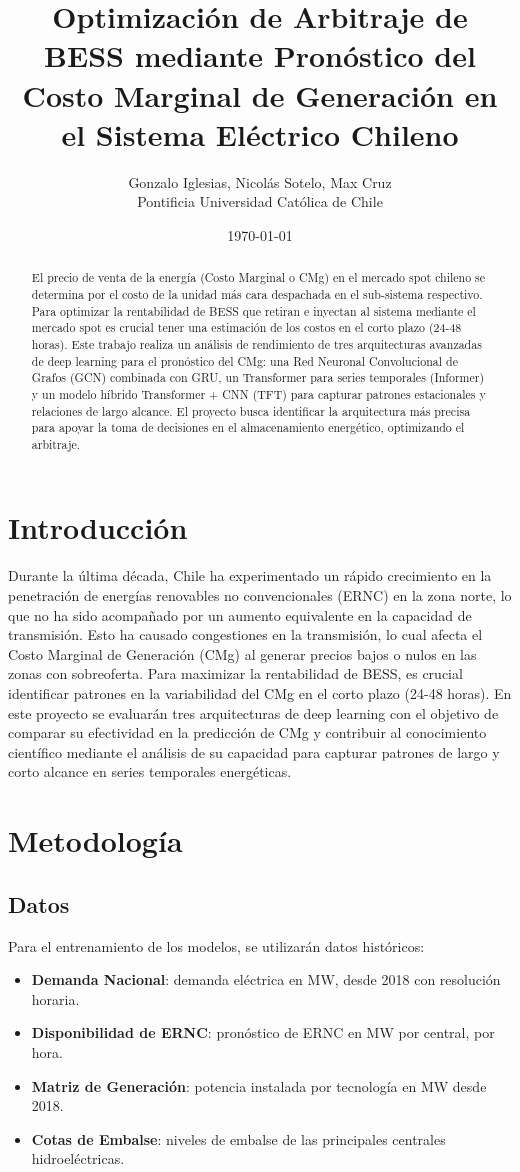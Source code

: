 \documentclass[twocolumn]{article}
\title{Optimización de Arbitraje de BESS mediante Pronóstico del Costo Marginal de Generación en el Sistema Eléctrico Chileno}
\author{Gonzalo Iglesias, Nicolás Sotelo, Max Cruz  \\
    Pontificia Universidad Católica de Chile  \\
    }
\date{\today}
\begin{document}
\maketitle

\begin{abstract}
El precio de venta de la energía (Costo Marginal o CMg) en el mercado spot chileno se determina por el costo de la unidad más cara despachada en el sub-sistema respectivo. Para optimizar la rentabilidad de BESS que retiran e inyectan al sistema mediante el mercado spot es crucial tener una estimación de los costos en el corto plazo (24-48 horas). Este trabajo realiza un análisis de rendimiento de tres arquitecturas avanzadas de deep learning para el pronóstico del CMg: una Red Neuronal Convolucional de Grafos (GCN) combinada con GRU, un Transformer para series temporales (Informer) y un modelo híbrido Transformer + CNN (TFT) para capturar patrones estacionales y relaciones de largo alcance. El proyecto busca identificar la arquitectura más precisa para apoyar la toma de decisiones en el almacenamiento energético, optimizando el arbitraje.
\end{abstract}

\section{Introducción}
Durante la última década, Chile ha experimentado un rápido crecimiento en la penetración de energías renovables no convencionales (ERNC) en la zona norte, lo que no ha sido acompañado por un aumento equivalente en la capacidad de transmisión. Esto ha causado congestiones en la transmisión, lo cual afecta el Costo Marginal de Generación (CMg) al generar precios bajos o nulos en las zonas con sobreoferta. Para maximizar la rentabilidad de BESS, es crucial identificar patrones en la variabilidad del CMg en el corto plazo (24-48 horas). En este proyecto se evaluarán tres arquitecturas de deep learning con el objetivo de comparar su efectividad en la predicción de CMg y contribuir al conocimiento científico mediante el análisis de su capacidad para capturar patrones de largo y corto alcance en series temporales energéticas.

\section{Metodología}
\subsection{Datos}
Para el entrenamiento de los modelos, se utilizarán datos históricos:
\begin{itemize}
    \item \textbf{Demanda Nacional}: demanda eléctrica en MW, desde 2018 con resolución horaria.
    \item \textbf{Disponibilidad de ERNC}: pronóstico de ERNC en MW por central, por hora.
    \item \textbf{Matriz de Generación}: potencia instalada por tecnología en MW desde 2018.
    \item \textbf{Cotas de Embalse}: niveles de embalse de las principales centrales hidroeléctricas.
\end{itemize}
\end{document}
